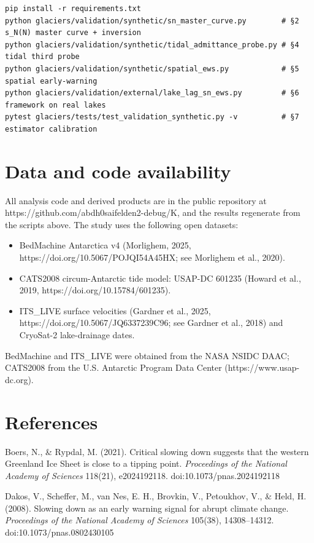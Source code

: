 \documentclass[11pt]{article}
\begin{document}
\begin{Verbatim}
pip install -r requirements.txt
python glaciers/validation/synthetic/sn_master_curve.py        # §2 s_N(N) master curve + inversion
python glaciers/validation/synthetic/tidal_admittance_probe.py # §4 tidal third probe
python glaciers/validation/synthetic/spatial_ews.py            # §5 spatial early-warning
python glaciers/validation/external/lake_lag_sn_ews.py         # §6 framework on real lakes
pytest glaciers/tests/test_validation_synthetic.py -v          # §7 estimator calibration
\end{Verbatim}

\section*{Data and code availability}


All analysis code and derived products are in the public repository at https://github.com/abdh0saifelden2-debug/K, and the results regenerate from the scripts above. The study uses the following open datasets:


\begin{itemize}
\item BedMachine Antarctica v4 (Morlighem, 2025, https://doi.org/10.5067/POJQI54A45HX; see Morlighem et al., 2020).
\item CATS2008 circum-Antarctic tide model: USAP-DC 601235 (Howard et al., 2019, https://doi.org/10.15784/601235).
\item ITS\_LIVE surface velocities (Gardner et al., 2025, https://doi.org/10.5067/JQ6337239C96; see Gardner et al., 2018) and CryoSat-2 lake-drainage dates.
\end{itemize}


BedMachine and ITS\_LIVE were obtained from the NASA NSIDC DAAC; CATS2008 from the U.S. Antarctic Program Data Center (https://www.usap-dc.org).


\section*{References}


Boers, N., \& Rypdal, M. (2021). Critical slowing down suggests that the western Greenland Ice Sheet is close to a tipping point. \emph{Proceedings of the National Academy of Sciences} 118(21), e2024192118. doi:10.1073/pnas.2024192118


Dakos, V., Scheffer, M., van Nes, E. H., Brovkin, V., Petoukhov, V., \& Held, H. (2008). Slowing down as an early warning signal for abrupt climate change. \emph{Proceedings of the National Academy of Sciences} 105(38), 14308–14312. doi:10.1073/pnas.0802430105
\end{document}
